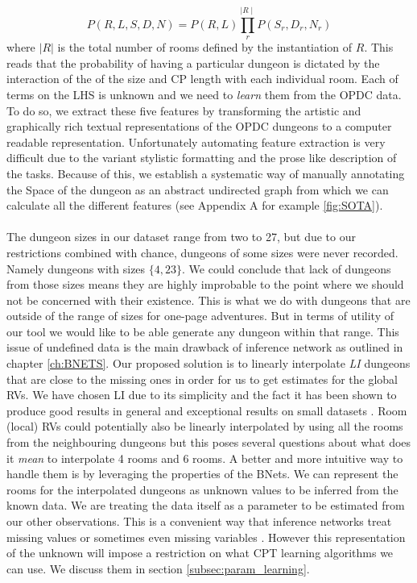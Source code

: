 \documentclass{UoYCSproject}
\begin{document}
\begin{equation}
  \label{eq:full_joint_PD}
  P(R,L,S,D,N) = P(R, L) \prod_{r}^{\mid R \mid} P(S_r, D_r, N_r)
\end{equation}
where \(|R|\) is the total number of rooms defined by the instantiation of \(R\). This reads that the probability of having a particular dungeon is dictated by the interaction of the of the size and CP length with each individual room. Each of terms on the LHS is unknown and we need to \textit{learn} them from the OPDC data. To do so, we extract these five features by transforming the artistic and graphically rich textual representations of the OPDC dungeons to a computer readable representation. Unfortunately automating feature extraction is very difficult due to the variant stylistic formatting and the prose like description of the tasks. Because of this, we establish a systematic way of manually annotating the Space of the dungeon as an abstract undirected graph from which we can calculate all the different features (see Appendix A for example \ref{fig:SOTA}).

\paragraph{}
The dungeon sizes in our dataset range from two to 27, but due to our restrictions combined with chance, dungeons of some sizes were never recorded. Namely dungeons with sizes \(\{4,23\}\). We could conclude that lack of dungeons from those sizes means they are highly improbable to the point where we should not be concerned with their existence. This is what we do with dungeons that are outside of the range of sizes for one-page adventures. But in terms of utility of our tool we would like to be able generate any dungeon within that range. This issue of undefined data is the main drawback of inference network as outlined in chapter \ref{ch:BNETS}. Our proposed solution is to linearly interpolate \textit{LI} dungeons that are close to the missing ones in order for us to get estimates for the global RVs. We have chosen LI due to its simplicity and the fact it has been shown to produce good results in general \parencite{Ibargengoytia2013OnTE} and exceptional results on small datasets \parencite{yu2004advances}. Room (local) RVs could potentially also be linearly interpolated by using all the rooms from the neighbouring dungeons but this poses several questions about what does it \textit{mean} to interpolate 4 rooms and 6 rooms. A better and more intuitive way to handle them is by leveraging the properties of the BNets. We can represent the rooms for the interpolated dungeons as unknown values to be inferred from the known data. We are treating the data itself as a parameter to be estimated from our other observations. This is a convenient way that inference networks treat missing values or sometimes even missing variables \parencite[p45]{neticaCman}. However this representation of the unknown will impose a restriction on what CPT learning algorithms we can use. We discuss them in section \ref{subsec:param_learning}.
\end{document}
